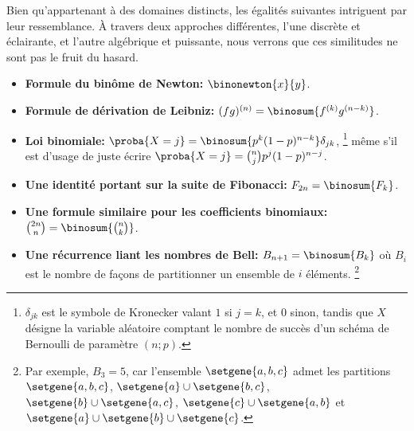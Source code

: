 Bien qu'appartenant à des domaines distincts, les égalités suivantes intriguent par leur ressemblance. 
%
À travers deux approches différentes, l'une discrète et éclairante, et l'autre algébrique et puissante, nous verrons que ces similitudes ne sont pas le fruit du hasard.
%
\begin{itemize}
    \item \textbf{Formule du binôme de Newton:}
    $\binonewton{x}{y}$.


    \item \textbf{Formule de dérivation de Leibniz:}
    $(fg)^{(n)} = \binosum{f^{(k)} g^{(n-k)}}$.


    \item \textbf{Loi binomiale:}
    $\proba{X = j} = \binosum{p^k (1 - p)^{n-k}} \delta_{jk}$,%
    \footnote{
    	$\delta_{jk}$ est le symbole de Kronecker valant $1$ si $j=k$, et $0$ sinon,
		tandis que
		$X$ désigne la variable aléatoire comptant le nombre de succès d'un schéma de Bernoulli de paramètre $(n ; p)$.
    }
    même s'il est d'usage de juste écrire
    $\proba{X = j} =\binom{n}{j} p^j (1 - p)^{n-j}$.


    \item \textbf{Une identité portant sur la suite de Fibonacci:}
    $F_{2n} = \binosum{F_k}$.


    \item \textbf{Une formule similaire pour les coefficients binomiaux:}
    $\binom{2n}{n} = \binosum{\binom{n}{k}}$.


    \item \textbf{Une récurrence liant les nombres de Bell:}
    $B_{n+1} = \binosum{B_k}$ où $B_i$ est le nombre de façons de partitionner un ensemble de $i$ éléments.%
    \footnote{
    	Par exemple,
    	$B_3 = 5$,
    	car l'ensemble $\setgene{ a , b , c }$ admet les partitions
    	$\setgene{ a , b , c }$,
    	$\setgene{ a } \cup \setgene{ b , c }$,
    	$\setgene{ b } \cup \setgene{ a , c }$,
    	$\setgene{ c } \cup \setgene{ a , b }$
		et
    	$\setgene{ a } \cup \setgene{ b } \cup \setgene{ c }$.
	}
\end{itemize}